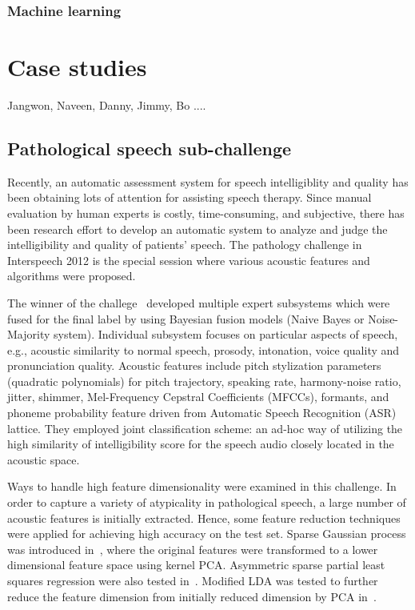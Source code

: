 \documentclass{article}
\begin{document}
\subsubsection{Machine learning}


\section{Case studies}
Jangwon, Naveen, Danny, Jimmy, Bo ....

\subsection{Pathological speech sub-challenge}
Recently, an automatic assessment system for speech intelligiblity and quality has been obtaining lots of attention for assisting speech therapy.
Since manual evaluation by human experts is costly, time-consuming, and subjective, there has been research effort to develop an automatic system to analyze and judge the intelligibility and quality of patients' speech.
The pathology challenge in Interspeech 2012 is the special session where various acoustic features and algorithms were proposed.

The winner of the challege~\cite{kim2012intelligibility} developed multiple expert subsystems which were fused for the final label by using Bayesian fusion models (Naive Bayes or Noise-Majority system).
Individual subsystem focuses on particular aspects of speech, e.g., acoustic similarity to normal speech, prosody, intonation, voice quality and pronunciation quality.
Acoustic features include pitch stylization parameters (quadratic polynomials) for pitch trajectory, speaking rate, harmony-noise ratio, jitter, shimmer, Mel-Frequency Cepstral Coefficients (MFCCs), formants, and phoneme probability feature driven from Automatic Speech Recognition (ASR) lattice.
They employed joint classification scheme: an ad-hoc way of utilizing the high similarity of intelligibility score for the speech audio closely located in the acoustic space.

Ways to handle high feature dimensionality were examined in this challenge.
In order to capture a variety of atypicality in pathological speech, a large number of acoustic features is initially extracted.
Hence, some feature reduction techniques were applied for achieving high accuracy on the test set.
Sparse Gaussian process was introduced in~\cite{lu2012predicting}, where the original features were transformed to a lower dimensional feature space using kernel PCA.
Asymmetric sparse partial least squares regression were also tested in~\cite{huang2012detecting}.
Modified LDA was tested to further reduce the feature dimension from initially reduced dimension by PCA in~\cite{zhou2012automatic}.
\end{document}
